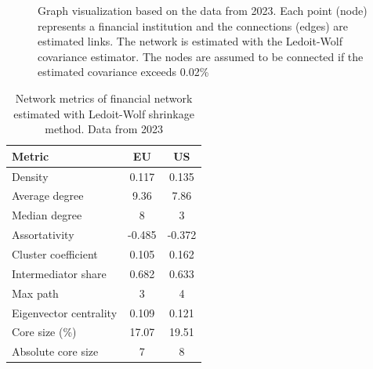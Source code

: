 \documentclass[12pt]{article}
\begin{document}
\begin{figure}[!htbp]
	\quad	
	
	\caption{Graph visualization based on the data from 2023. Each point (node) represents a financial institution and the connections (edges) are estimated links. The network is estimated with the Ledoit-Wolf covariance estimator. The nodes are assumed to be connected if the estimated covariance exceeds 0.02\%}	\label{fig:actual_network_lw}
\end{figure}

\begin{table}[!htbp]
	\center
	\begin{tabular}{l |c|c}
		Metric & EU & US \\
		\hline
		Density & 0.117 & 0.135 \\
		Average degree & 9.36 & 7.86 \\
		Median degree & 8 & 3 \\
		Assortativity & -0.485 & -0.372 \\
		Cluster coefficient & 0.105 & 0.162 \\
		Intermediator share & 0.682 & 0.633 \\
		Max path & 3 & 4 \\
		Eigenvector centrality & 0.109 & 0.121 \\
		Core size (\%) & 17.07 & 19.51 \\
		Absolute core size & 7 & 8 \\
	\end{tabular}
	\label{table:lw_stats}
	\caption{Network metrics of financial network estimated with Ledoit-Wolf shrinkage method. Data from 2023}
\end{table}
\end{document}
